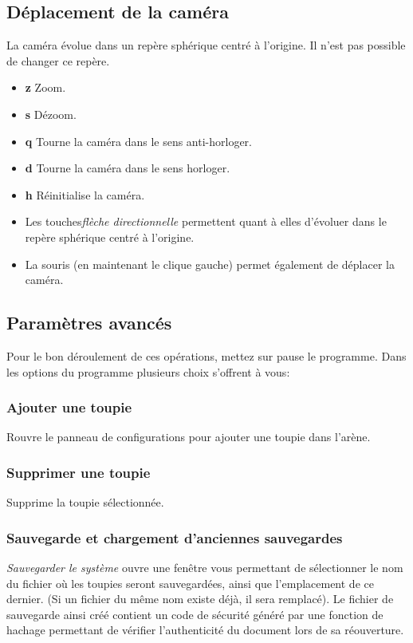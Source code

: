 \documentclass[a4paper]{article}%
\begin{document}
	\subsection {Déplacement de la caméra}
		La caméra évolue dans un repère sphérique centré à l'origine. Il n'est pas possible de changer ce repère.
		\begin {itemize}
			\item[\textbf{z}] Zoom.
			\item[\textbf{s}] Dézoom.
			\item[\textbf{q}] Tourne la caméra dans le sens anti-horloger.
			\item[\textbf{d}] Tourne la caméra dans le sens horloger.
			\item[\textbf{h}] Réinitialise la caméra.
			\item Les touches\emph {flèche directionnelle} permettent quant à elles d'évoluer dans le repère sphérique centré à l'origine.
			\item La souris (en maintenant le clique gauche) permet également de déplacer la caméra.
		\end{itemize}
	\subsection {Paramètres avancés}
		Pour le bon déroulement de ces opérations, mettez sur pause le programme.
		Dans les options du programme plusieurs choix s'offrent à vous:
		\subsubsection {Ajouter une toupie}
			Rouvre le panneau de configurations pour ajouter une toupie dans l'arène. 
		\subsubsection {Supprimer une toupie}
			Supprime la toupie sélectionnée.
		\subsubsection {Sauvegarde et chargement d'anciennes sauvegardes}
			\emph {Sauvegarder le système} ouvre une fenêtre vous permettant de sélectionner le nom du fichier où les toupies seront sauvegardées, ainsi que l'emplacement de ce dernier. (Si un fichier du même nom existe déjà, il sera remplacé). 
			Le fichier de sauvegarde ainsi créé contient un code de sécurité généré par une fonction de hachage permettant de vérifier l'authenticité du document lors de sa réouverture. \\
			
\end{document}
